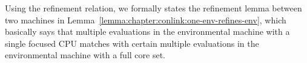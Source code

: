 


%
%


Using the refinement relation, 
we formally states the refinement lemma between two machines in Lemma~\ref{lemma:chapter:conlink:one-env-refines-env},
which basically says that 
multiple evaluations in the environmental machine with a single focused CPU matches with certain multiple evaluations in the environmental machine with a full core set.

